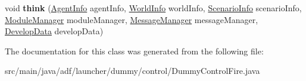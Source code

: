 \begin{DoxyCompactItemize}
\hypertarget{classadf_1_1launcher_1_1dummy_1_1control_1_1DummyControlFire_aaa747fa390bce6537f0462e51dfb8faa}{}\label{classadf_1_1launcher_1_1dummy_1_1control_1_1DummyControlFire_aaa747fa390bce6537f0462e51dfb8faa} 
void {\bfseries think} (\hyperlink{classadf_1_1agent_1_1info_1_1AgentInfo}{Agent\+Info} agent\+Info, \hyperlink{classadf_1_1agent_1_1info_1_1WorldInfo}{World\+Info} world\+Info, \hyperlink{classadf_1_1agent_1_1info_1_1ScenarioInfo}{Scenario\+Info} scenario\+Info, \hyperlink{classadf_1_1agent_1_1module_1_1ModuleManager}{Module\+Manager} module\+Manager, \hyperlink{classadf_1_1agent_1_1communication_1_1MessageManager}{Message\+Manager} message\+Manager, \hyperlink{classadf_1_1agent_1_1develop_1_1DevelopData}{Develop\+Data} develop\+Data)
\end{DoxyCompactItemize}


The documentation for this class was generated from the following file\+:\begin{DoxyCompactItemize}
\item 
src/main/java/adf/launcher/dummy/control/Dummy\+Control\+Fire.\+java\end{DoxyCompactItemize}
